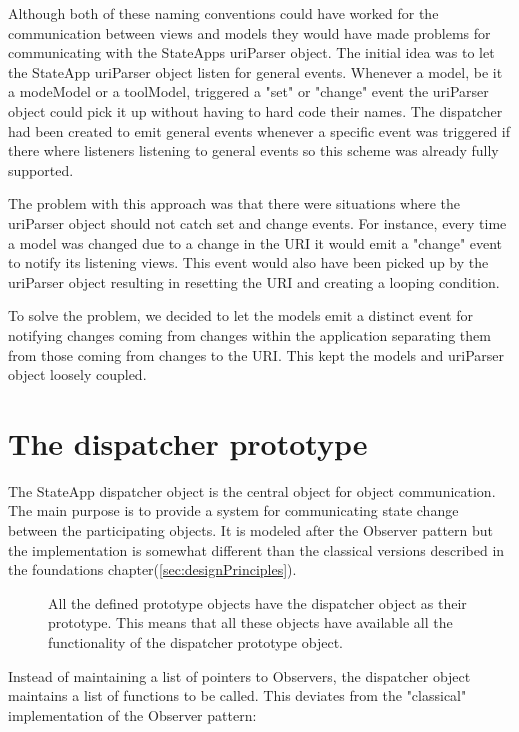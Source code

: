 \documentclass[english]{ifimaster}
\begin{document}
Although both of these naming conventions could have worked for the communication between views and models they would have made problems for communicating with the StateApps uriParser object. The initial idea was to let the StateApp uriParser object listen for general events. Whenever a model, be it a modeModel or a toolModel, triggered a "set" or "change" event the uriParser object could pick it up without having to hard code their names. The dispatcher had been created to emit general events whenever a specific event was triggered if there where listeners listening to general events so this scheme was already fully supported. 

The problem with this approach was that there were situations where the uriParser object should not catch set and change events. For instance, every time a model was changed due to a change in the URI it would emit a "change" event to notify its listening views. This event would also have been picked up by the uriParser object resulting in resetting the URI and creating a looping condition. 

To solve the problem, we decided to let the models emit a distinct event for notifying changes coming from changes within the application separating them from those coming from changes to the URI. This kept the models and uriParser object loosely coupled.



\section{The dispatcher prototype}
\label{sec:dispatcher}
The StateApp dispatcher object is the central object for object communication. The main purpose is to provide a system for communicating state change between the participating objects. It is modeled after the Observer pattern but the implementation is somewhat different than the classical versions described in the foundations chapter(\ref{sec:designPrinciples}).
\begin{figure}
\centering

\caption{All the defined prototype objects have the dispatcher object as their prototype. This means that all these objects have available all the functionality of the dispatcher prototype object.} \label{fig:dispatcher}

\end{figure}
Instead of maintaining a list of pointers to Observers, the dispatcher object maintains a list of functions to be called. This deviates from the "classical" implementation of the Observer pattern: 
\end{document}
